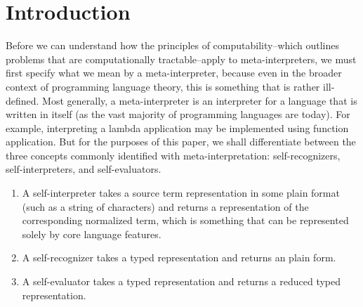 \documentclass[conference]{IEEEtran}
\begin{document}
\section{Introduction}
Before we can understand how the principles of computability--which outlines problems that are computationally tractable--apply to meta-interpreters, we must first specify what we mean by a meta-interpreter, because even in the broader context of programming language theory, this is something that is rather ill-defined. Most generally, a meta-interpreter is an interpreter for a language that is written in itself (as the vast majority of programming languages are today). For example, interpreting a lambda application may be implemented using function application. But for the purposes of this paper, we shall differentiate between the three concepts commonly identified with meta-interpretation: self-recognizers, self-interpreters, and self-evaluators\cite{pierce2002types}.
\begin{enumerate}
    \item A self-interpreter takes a source term representation in some plain format (such as a string of characters) and returns a representation of the corresponding normalized term, which is something that can be represented solely by core language features.
    \item A self-recognizer takes a typed representation and returns an plain form.
    \item A self-evaluator takes a typed representation and returns a reduced typed representation.
\end{enumerate}



\end{document}
